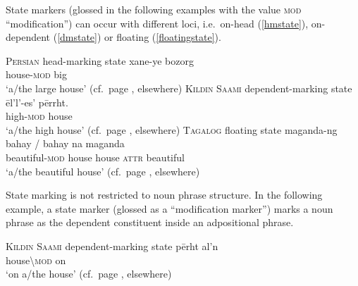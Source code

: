 State markers (glossed in the following examples with the value \textsc{mod} “modification”) can occur with different loci, i.e.~on-head (\ref{hmstate}), on-dependent (\ref{dmstate}) or floating (\ref{floatingstate}).
\newpage
\begin{exe}
\ex
\begin{xlist}
\ex \textsc{Persian} head-marking state \label{hmstate}
\gll xane-ye bozorg\\
	house-\textsc{mod} big\\
\glt 	‘a/the large house’ (cf.~page \pageref{persian constr state}, elsewhere)
\ex	\textsc{Kildin Saami} dependent-marking state \label{dmstate}
\gll 	ēl'l'-es' 		pērrht.\\
	high-\textsc{mod}	house\\
\glt	‘a/the high house’ (cf.~page \pageref{kildin attr.adj.sg}, elsewhere)
\ex	\textsc{Tagalog} floating state \label{floatingstate}
\gll maganda-ng bahay / bahay na maganda\\
	beautiful-\textsc{mod} house {} house \textsc{attr} beautiful\\
\glt	‘a/the beautiful house’ (cf.~page \pageref{tagalog linker}, elsewhere)
\end{xlist}
\end{exe}
State marking is not restricted to noun phrase structure. In the following example, a state marker (glossed as a “modification marker”) marks a noun phrase as the dependent constituent inside an adpositional phrase.
\begin{exe}
\ex \textsc{Kildin Saami} dependent-marking state
\gll 	pērht		al'n\\
	house\textbackslash\textsc{mod}	on\\
\glt 	‘on a/the house’ (cf.~page \pageref{state ap kildin}, elsewhere)
\end{exe}

